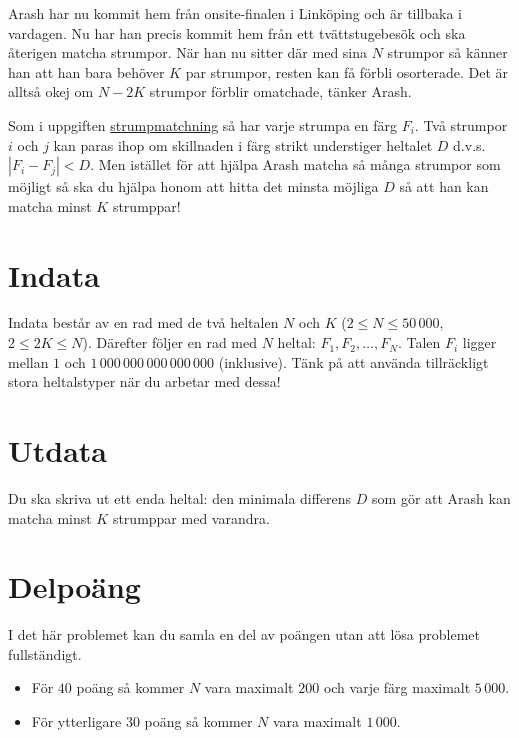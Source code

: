 
Arash har nu kommit hem från onsite-finalen i Linköping och är tillbaka i
vardagen. Nu har han precis kommit hem från ett tvättstugebesök och ska
återigen matcha strumpor. När han nu sitter där med sina $N$ strumpor
så känner han att han bara behöver $K$ par strumpor, resten kan få förbli
osorterade. Det är alltså okej om $N-2K$ strumpor förblir omatchade, tänker Arash.

Som i uppgiften \href{https://po.scrool.se/problems/strumpor}{strumpmatchning}
så har varje strumpa en färg $F_i$. Två strumpor $i$ och $j$ kan paras ihop om
skillnaden i färg strikt understiger heltalet $D$ d.v.s. $|F_{i} - F_{j}|<D$.
Men istället för att hjälpa Arash matcha så många strumpor som möjligt så ska
du hjälpa honom att hitta det minsta möjliga $D$
så att han kan matcha minst $K$ strumppar!

\section*{Indata}

Indata består av en rad med de två heltalen $N$ och $K$ ($2 \le N
\le 50\,000$, $2 \le 2K \le N$). Därefter följer en rad med $N$
heltal: $F_1, F_2, \dots, F_N$. Talen $F_i$ ligger mellan $1$
och $1\,000\,000\,000\,000\,000$ (inklusive). Tänk på att använda
tillräckligt stora heltalstyper när du arbetar med dessa!

\section*{Utdata}

Du ska skriva ut ett enda heltal: den minimala differens $D$ som gör att Arash kan
matcha minst $K$ strumppar med varandra.

\section*{Delpoäng}

I det här problemet kan du samla en del av poängen utan att lösa
problemet fullständigt.

\begin{itemize}
    \item För $40$ poäng så kommer $N$ vara maximalt $200$ och varje färg maximalt $5\,000$.
    \item För ytterligare $30$ poäng så kommer $N$ vara maximalt $1\,000$.
\end{itemize}
